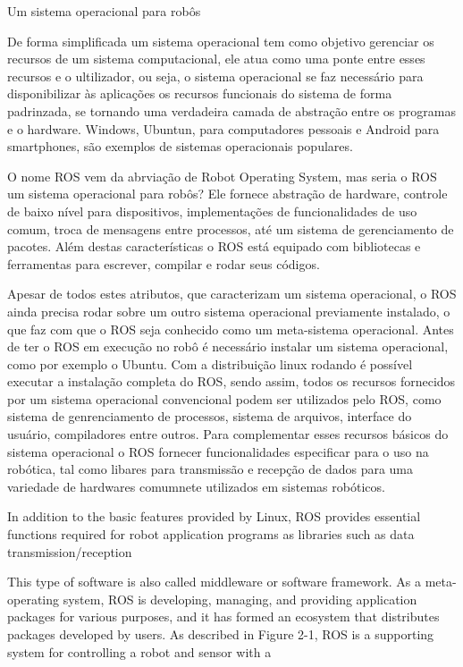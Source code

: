 Um sistema operacional para robôs

De forma simplificada um sistema operacional tem como objetivo gerenciar os recursos de um sistema computacional, ele atua como uma ponte entre esses recursos e o ultilizador, ou seja, o sistema operacional se faz necessário para disponibilizar às aplicações os recursos 
funcionais do sistema de forma padrinzada, se tornando uma verdadeira camada de abstração entre os programas e o hardware. Windows, Ubuntun, para computadores pessoais e Android para smartphones, são exemplos de sistemas operacionais populares.

O nome ROS vem da abrviação de Robot Operating System, mas seria o ROS um sistema operacional para robôs? Ele fornece abstração de hardware, controle de baixo nível para dispositivos, implementações de funcionalidades de uso comum, troca de mensagens entre processos, até um sistema de gerenciamento de pacotes. Além destas características o ROS está equipado com bibliotecas e ferramentas para escrever, compilar e rodar seus códigos. %

Apesar de todos estes atributos, que caracterizam um sistema operacional, o ROS ainda precisa rodar sobre um outro sistema operacional previamente instalado, o que faz com que o ROS seja conhecido como um meta-sistema operacional. Antes de ter o ROS em execução no robô é necessário instalar um sistema operacional, como por exemplo o Ubuntu. Com a distribuição linux rodando é possível executar a instalação completa do ROS, sendo assim, todos os recursos fornecidos por um sistema operacional convencional podem ser utilizados pelo ROS, como sistema de genrenciamento de processos, sistema de arquivos, interface do usuário, compiladores entre outros. Para complementar esses recursos básicos do sistema operacional o ROS fornecer funcionalidades especificar para o uso na robótica, tal como libares para transmissão e recepção de dados para uma variedade de hardwares comumnete utilizados em sistemas robóticos. 

In addition to the basic features provided by Linux, ROS provides essential functions required for robot application programs as libraries such as data transmission/reception 


This type of software is also called middleware or software framework. As a meta-operating system, ROS is developing, managing, and providing application packages for various purposes, and it has formed an ecosystem that distributes packages developed by users. 
As described in Figure 2-1, ROS is a supporting system for controlling a robot and sensor with a 

